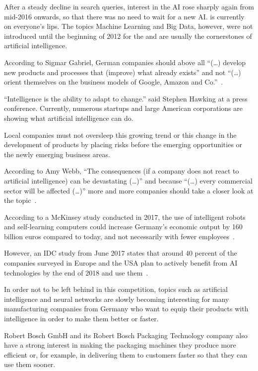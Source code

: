 After a steady decline in search queries, interest in the AI rose sharply again from mid-2016 onwards, so that there was
no need to wait for a new AI. is currently on everyone's lips. The topics Machine Learning and Big Data, however, were
not introduced until the beginning of 2012 for the and are usually the cornerstones of artificial intelligence.

According to Sigmar Gabriel, German companies should above all \enquote{(\ldots) develop new products and processes that
(improve) what already exists} and not \enquote{(\ldots) orient themselves on the business models of Google, Amazon and
Co.}~\cite{article_einleitung_ww_sg}.

\enquote{Intelligence is the ability to adapt to change.} said Stephen Hawking at a press conference. Currently,
numerous startups and large American corporations are showing what artificial intelligence can do.

Local companies must not oversleep this growing trend or this change in the development of products by placing risks
before the emerging opportunities or the newly emerging business areas.

According to Amy Webb, \enquote{The consequences (if a company does not react to artificial intelligence) can be
devastating (\ldots)} and because \enquote{(\ldots) every commercial sector will be affected (\ldots)} more and more
companies should take a closer look at the topic~\cite{article_einleitung_dub_aw}.

According to a McKinsey study conducted in 2017, the use of intelligent robots and self-learning computers could
increase Germany's economic output by 160 billion euros compared to today, and not necessarily with fewer
employees~\cite{online_einleitung_mckinsey}.

However, an IDC study from June 2017 states that around 40 percent of the companies surveyed in Europe and the USA plan
to actively benefit from AI technologies by the end of 2018 and use them~\cite{article_grundlagen_salesforce}.

In order not to be left behind in this competition, topics such as artificial intelligence and neural networks are
slowly becoming interesting for many manufacturing companies from Germany who want to equip their products with
intelligence in order to make them better or faster.

Robert Bosch GmbH and its Robert Bosch Packaging Technology company also have a strong interest in making the packaging
machines they produce more efficient or, for example, in delivering them to customers faster so that they can use them
sooner.

